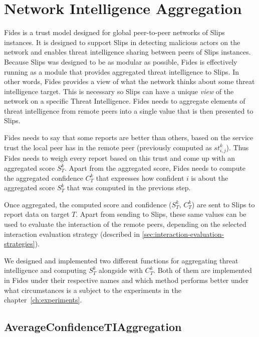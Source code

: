 \section{Network Intelligence Aggregation}
\label{sec:network-intelligence-aggregation}
Fides is a trust model designed for global peer-to-peer networks of Slips instances.
It is designed to support Slips in detecting malicious actors on the network and enables threat intelligence sharing between peers of Slips instances.
Because Slips was designed to be as modular as possible, Fides is effectively running as a module that provides aggregated threat intelligence to Slips. 
In other words, Fides provides a view of what the network thinks about some threat intelligence target. This is necessary so Slips can have a unique \textit{view} of the network on a specific Threat Intelligence.
Fides needs to aggregate elements of threat intelligence from remote peers into a single value that is then presented to Slips.

Fides needs to say that some reports are better than others, based on the service trust the local peer has in the remote peer (previously computed as $st^{k}_{i, j}$).
Thus Fides needs to weigh every report based on this trust and come up with an aggregated score $S^{k}_{T}$.
Apart from the aggregated score, Fides needs to compute the aggregated confidence $C^{k}_{T}$ that expresses how confident $i$ is about the aggregated score $S^{k}_{T}$ that was computed in the previous step.

Once aggregated, the computed score and confidence ($S^{k}_{T}$, $C^{k}_{T}$) are sent to Slips to report data on target $T$.
Apart from sending to Slips, these same values can be used to evaluate the interaction of the remote peers, depending on the selected interaction evaluation strategy (described in \ref{sec:interaction-evaluation-strategies}).

We designed and implemented two different functions for aggregating threat intelligence and computing $S^{k}_{T}$ alongside with $C^{k}_{T}$.
Both of them are implemented in Fides under their respective names and which method performs better under what circumstances is a subject to the experiments in the chapter~\ref{ch:experiments}.

\subsection{AverageConfidenceTIAggregation}
\label{subsec:AverageConfidenceTIAggregation}

